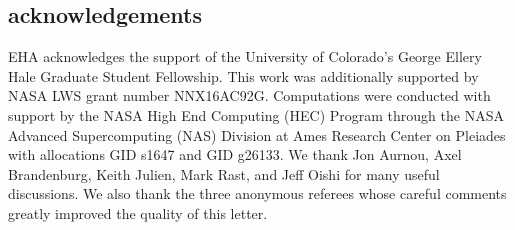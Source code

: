 \documentclass[aps, prl, twocolumn, nofootinbib, groupedaddress, amsfonts, amssymb, amsmath]{revtex4-1}
\begin{document}
\subsection{acknowledgements}
EHA acknowledges the support of the University of Colorado's George 
Ellery Hale Graduate Student Fellowship.
This work was additionally supported by  NASA LWS grant number NNX16AC92G.  
Computations were conducted 
with support by the NASA High End Computing (HEC) Program through the NASA 
Advanced Supercomputing (NAS) Division at Ames Research Center on Pleiades
with allocations GID s1647 and GID g26133.
We thank Jon Aurnou, Axel Brandenburg, Keith Julien, Mark Rast, and Jeff Oishi 
for many useful discussions. We also thank the three anonymous referees whose
careful comments greatly improved the quality of this letter.


\end{document}
